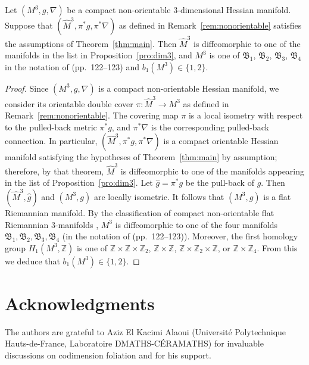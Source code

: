 \begin{cor}
Let $(M^3, g,\nabla)$ be a compact non-orientable $3$-dimensional Hessian manifold. Suppose that $(\hat{M}^3,\pi^*g, \pi^*\nabla)$ as defined in Remark~\ref{rem:nonorientable} satisfies the assumptions of Theorem~\ref{thm:main}. Then $\hat{M}^3$ is diffeomorphic to one of the manifolds in the list in Proposition~\ref{pro:dim3}, and $M^3$ is one of $\mathfrak{B}_1$, $\mathfrak{B}_2$, $\mathfrak{B}_3$, $\mathfrak{B}_4$ in the notation of \citep{Wolf1974} (pp.~122--123) and $b_{1}(M^3)\in \{1, 2\}$.
\end{cor}
\begin{proof}
Since $(M^3,g,\nabla)$ is a compact non-orientable Hessian manifold, we consider its orientable double cover $\pi \colon \hat{M}^3 \to M^3$ as defined in Remark~\ref{rem:nonorientable}. The covering map $\pi$ is a local isometry with respect to the pulled-back metric $\pi^{*}g$, and $\pi^{*}\nabla$ is the corresponding pulled-back connection. In particular, $(\hat{M}^3,\pi^{*}g,\pi^{*}\nabla)$ is a compact orientable Hessian manifold satisfying the hypotheses of Theorem~\ref{thm:main} by assumption; therefore, by that theorem, $\hat{M}^3$ is diffeomorphic to one of the manifolds appearing in the list of Proposition~\ref{pro:dim3}.
Let $\hat{g} = \pi^{*}g$ be the pull-back of $g$. Then $(\hat{M}^3, \hat{g})$ and $(M^3, g)$ are locally isometric. It follows that $(M^3,g)$ is a flat Riemannian manifold. By the classification of compact non-orientable flat Riemannian $3$-manifolds \citep{Wolf1974}, $M^3$ is diffeomorphic to one of the four manifolds $\mathfrak{B}_1, \mathfrak{B}_2, \mathfrak{B}_3, \mathfrak{B}_4$ (in the notation of \citep{Wolf1974} (pp.~122--123)). Moreover, the first homology group $H_1(M^3,\mathbb{Z})$ is one of $\mathbb{Z} \times \mathbb{Z} \times \mathbb{Z}_2$, $\mathbb{Z} \times \mathbb{Z}$, $\mathbb{Z} \times \mathbb{Z}_2 \times \mathbb{Z}$, or $\mathbb{Z} \times \mathbb{Z}_4$. From this we deduce that $b_{1}(M^3)\in \{1, 2\}$.
\end{proof}

\section*{Acknowledgments}	
  
 The authors are grateful to Aziz El Kacimi Alaoui (Universit\'e Polytechnique Hauts-de-France, Laboratoire DMATHS-C\'ERAMATHS) for invaluable discussions on codimension foliation and for his support.